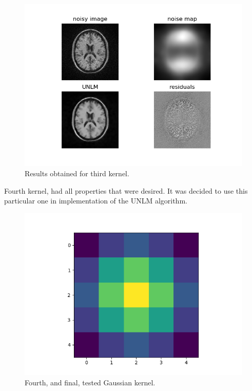 \begin{figure}[H]
	\centering{}
	\includegraphics[scale=0.8]{figures/module05/gk3results}
	\caption{Results obtained for third kernel.} 
\end{figure}

Fourth kernel, had all properties that were desired. It was decided to use this particular one in implementation of the UNLM algorithm.

\begin{figure}[H]
	\centering{}
	\includegraphics[scale=0.7]{figures/module05/gk4}
	\caption{Fourth, and final, tested Gaussian kernel.} 
\end{figure}

